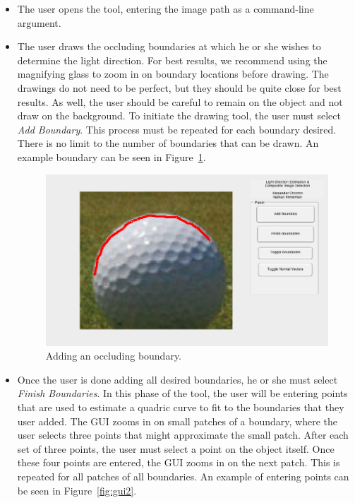 \documentclass[10pt,twocolumn,letterpaper]{article}
\begin{document}
\begin{itemize}
\item The user opens the tool, entering the image path as a command-line argument.

\item The user draws the occluding boundaries at which he or she wishes to determine the light direction. For best results, we recommend using the magnifying glass to zoom in on boundary locations before drawing. The drawings do not need to be perfect, but they should be quite close for best results. As well, the user should be careful to remain on the object and not draw on the background. To initiate the drawing tool, the user must select \emph{Add Boundary}. This process must be repeated for each boundary desired. There is no limit to the number of boundaries that can be drawn. An example boundary can be seen in Figure~\ref{fig:gui1}.

\begin{figure}[]
\begin{center}
	\includegraphics[width=0.9\linewidth]{gui1.png}
\end{center}
	\caption{Adding an occluding boundary.}
\label{fig:gui1}
\end{figure}

\item Once the user is done adding all desired boundaries, he or she must select \emph{Finish Boundaries}. In this phase of the tool, the user will be entering points that are used to estimate a quadric curve to fit to the boundaries that they user added. The GUI zooms in on small patches of a boundary, where the user selects three points that might approximate the small patch. After each set of three points, the user must select a point on the object itself. Once these four points are entered, the GUI zooms in on the next patch. This is repeated for all patches of all boundaries. An example of entering points can be seen in Figure~\ref{fig:gui2}.


\end{itemize}
\end{document}
